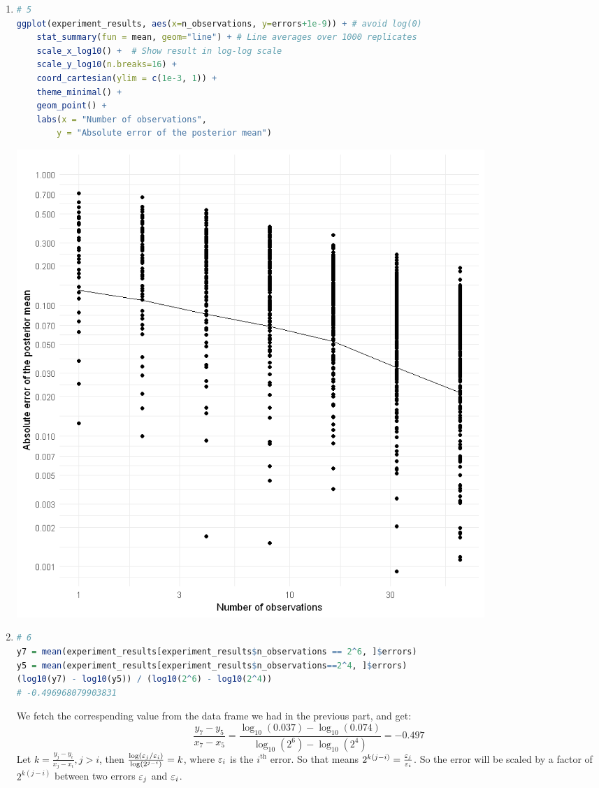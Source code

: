 \documentclass{article}
\begin{document}
\begin{enumerate}
\item 
\begin{lstlisting}[language=R]
# 5
ggplot(experiment_results, aes(x=n_observations, y=errors+1e-9)) + # avoid log(0)
    stat_summary(fun = mean, geom="line") + # Line averages over 1000 replicates
    scale_x_log10() +  # Show result in log-log scale
    scale_y_log10(n.breaks=16) +
    coord_cartesian(ylim = c(1e-3, 1)) +
    theme_minimal() +
    geom_point() +
    labs(x = "Number of observations",
        y = "Absolute error of the posterior mean")
\end{lstlisting}
\includegraphics[width=0.8\textwidth]{errors.png}


\item 
\begin{lstlisting}[language=R]
# 6
y7 = mean(experiment_results[experiment_results$n_observations == 2^6, ]$errors)
y5 = mean(experiment_results[experiment_results$n_observations==2^4, ]$errors)
(log10(y7) - log10(y5)) / (log10(2^6) - log10(2^4))
# -0.496968079903831
\end{lstlisting}
We fetch the correspending value from the data frame we had in the previous part, and get:
\[\frac{y_7 - y_5}{x_7 - x_5} = \frac{\log_{10}(0.037) - \log_{10}(0.074)}{\log_{10}(2^6) - \log_{10}(2^4)} = -0.497\]
Let $k = \frac{y_j - y_i}{x_j - x_i}, j > i$, then $\frac{\log (\varepsilon_j/\varepsilon_i)}{\log (2^{j-i})} = k$, where $\varepsilon_i$ is the $i^\text{th}$ error. So that means $2^{k(j-i)} = \frac{\varepsilon_j}{\varepsilon_i}$. So the error will be scaled by a factor of $2^{k(j-i)}$ between two errors $\varepsilon_j$ and $\varepsilon_i$.




\end{enumerate}
\end{document}
